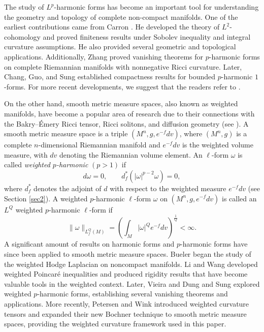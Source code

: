 \documentclass[10pt,a4paper]{amsart}
\numberwithin{equation}{section}
\begin{document}
The study of $L^p$-harmonic forms has become an important tool for understanding the geometry and topology of complete non-compact manifolds. One of the earliest contributions came from Carron \cite{Car98,Car99}. He developed the theory of $L^2$-cohomology and proved finiteness results under Sobolev inequality and integral curvature assumptions. He also provided several geometric and topological applications. Additionally, Zhang \cite{ZG01} proved vanishing theorems for $p$-harmonic forms on complete Riemannian manifolds with nonnegative Ricci curvature. Later, Chang, Guo, and Sung \cite{CGS10} established compactness results for bounded $p$-harmonic $1$-forms. For more recent developments, we suggest that the readers refer to \cite{CY16,CHB21,DDT23}.



On the other hand, smooth metric measure spaces, also known as weighted manifolds, have become a popular area of research due to their connections with the Bakry–Émery Ricci tensor, Ricci solitons, and diffusion geometry (see \cite{LO03,WW09}).  A smooth metric measure space is a triple $(M^n,g,e^{-f}dv)$, where $(M^n,g)$ is a complete $n$-dimensional Riemannian manifold and $e^{-f}dv$ is the weighted volume measure, with $dv$ denoting the Riemannian volume element.
An $\ell$-form $\omega$ is called \emph{weighted $p$-harmonic} $(p>1)$ if
\[
d\omega=0,\qquad d_f^*(|\omega|^{p-2}\omega)=0,
\]
where $d_f^*$ denotes the adjoint of $d$ with respect to the weighted measure $e^{-f}dv$ (see Section \ref{sec2}). A weighted $p$-harmonic $\ell$-form $\omega$ on $(M^n,g,e^{-f}dv)$ is called an $L^Q$ weighted $p$-harmonic $\ell$-form  if
\[
\|\omega\|_{L_f^Q(M)}
=
\left(
\int_M |\omega|^Qe^{-f}dv
\right)^{\frac1Q}
<\infty.
\]
A significant amount of results on harmonic forms and $p$-harmonic forms have since been applied to smooth metric measure spaces. Bueler \cite{B99} began the study of the weighted Hodge Laplacian on noncompact manifolds. Li and Wang \cite{LW06} developed weighted Poincaré inequalities and produced rigidity results that have become valuable tools in the weighted context. Later, Vieira \cite{VI13} and Dung and Sung \cite{DS19} explored weighted $p$-harmonic forms, establishing several vanishing theorems and applications. More recently, Petersen and Wink \cite{PW20} introduced weighted curvature tensors and expanded their new Bochner technique to smooth metric measure spaces, providing the weighted curvature framework used in this paper.
\end{document}
